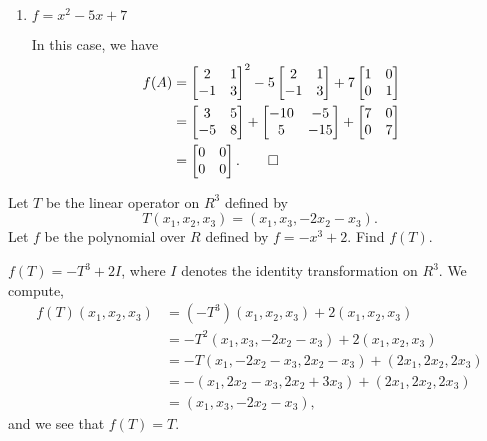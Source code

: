 \begin{enumerate}
\item $f = x^2 - 5x + 7$
  \begin{solution}
    In this case, we have
    \begin{align*}
      f(A)
      &=
      \begin{bmatrix}
        2 & 1 \\
        -1 & 3
      \end{bmatrix}^2
      - 5
      \begin{bmatrix}
        2 & 1 \\
        -1 & 3
      \end{bmatrix}
      + 7
      \begin{bmatrix}
        1 & 0 \\
        0 & 1
      \end{bmatrix} \\
      &=
      \begin{bmatrix}
        3 & 5 \\
        -5 & 8
      \end{bmatrix}
      +
      \begin{bmatrix}
        -10 & -5 \\
        5 & -15
      \end{bmatrix}
      +
      \begin{bmatrix}
        7 & 0 \\
        0 & 7
      \end{bmatrix} \\
      &=
      \begin{bmatrix}
        0 & 0 \\
        0 & 0
      \end{bmatrix}. \qedhere
    \end{align*}
  \end{solution}
\end{enumerate}

 Let $T$ be the linear operator on $R^3$ defined by
\begin{equation*}
  T(x_1, x_2, x_3) = (x_1, x_3, -2x_2 - x_3).
\end{equation*}
Let $f$ be the polynomial over $R$ defined by $f = -x^3 + 2$. Find
$f(T)$.
\begin{solution}
  $f(T) = -T^3 + 2I$, where $I$ denotes the identity transformation on
  $R^3$. We compute,
  \begin{align*}
    f(T)(x_1,x_2,x_3)
    &= (-T^3)(x_1,x_2,x_3) + 2(x_1,x_2,x_3) \\
    &= -T^2(x_1, x_3, -2x_2 - x_3) + 2(x_1,x_2,x_3) \\
    &= -T(x_1, -2x_2 - x_3, 2x_2 - x_3) + (2x_1,2x_2,2x_3) \\
    &= -(x_1, 2x_2 - x_3, 2x_2 + 3x_3) + (2x_1,2x_2,2x_3) \\
    &= (x_1, x_3, -2x_2 - x_3),
  \end{align*}
  and we see that $f(T) = T$.
\end{solution}
